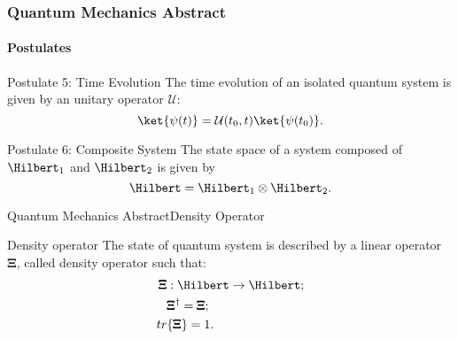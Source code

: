 \begin{frame}
    \frametitle{Quantum Mechanics Abstract}
    \framesubtitle{Postulates}

    \begin{block}{Postulate 5: Time Evolution}
        The time evolution of an isolated quantum system is given by an unitary operator
        $\mathcal{U}$:
        \begin{equation*}
            \ket{\psi(t)}=\mathcal{U}(t_0,t)\ket{\psi(t_0)}.
        \end{equation*}
    \end{block}
    \begin{block}{Postulate 6: Composite System}
        The state space of a system composed of $\Hilbert_1$ and $\Hilbert_2$ is given by
        \begin{equation*}
            \Hilbert=\Hilbert_1\otimes\Hilbert_2.
        \end{equation*}
    \end{block}
\end{frame}

\begin{frame}{Quantum Mechanics Abstract}{Density Operator}
    \begin{alertblock}{Density operator}
        The state of quantum system is described by a linear operator $\pmb{\Xi}$, called density
        operator such that:
        \begin{equation*}\begin{split}
            \pmb{\Xi}&:\Hilbert\to\Hilbert;\\
            &\pmb{\Xi}^\dagger=\pmb{\Xi};\\
            tr&\{\pmb{\Xi}\}=1.
        \end{split}\end{equation*}
    \end{alertblock}
\end{frame}